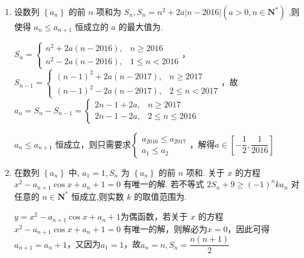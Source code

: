 \begin{enumerate}
\begin{jieda}
        综上，$k \in [-5, -3]$
    \end{jieda}
    
    \item 设数列 $\left\{  {a}_{n}\right\}$ 的前 $n$ 项和为 ${S}_{n},{S}_{n} = {n}^{2} + {2a}\left| {n - {2016}}\right| \left( {a > 0,n \in  {\mathbf{N}}^{ * }}\right)$ ,则使得 ${a}_{n} \leq  {a}_{n + 1}$ 恒成立的 $a$ 的最大值为.
    \begin{jieda}
    
        $S_n = \left\{\begin{array}{ll}
             n^2+2a(n-2016), & n \geq 2016 \\
             n^2-2a(n-2016), & 1 \leq n < 2016 
        \end{array}\right.$，$S_{n-1} = \left\{\begin{array}{ll}
             (n-1)^2+2a(n-2017), & n \geq 2017 \\
             (n-1)^2-2a(n-2017), & 2 \leq n < 2017 
        \end{array}\right.$，故$a_n = S_n - S_{n-1} = \left\{\begin{array}{ll}
            2n-1+2a, & n \geq 2017 \\
            2n-1-2a, & 2 \leq n \leq 2016
        \end{array}\right.$

        ${a}_{n} \leq  {a}_{n + 1}$ 恒成立，则只需要求$\left\{\begin{array}{l}
             a_{2016} \leq a_{2017}  \\
             a_1 \leq a_2 
        \end{array}\right.$，解得$a \in \left[-\dfrac{1}{2}, \dfrac{1}{2016}\right]$
    \end{jieda}
    
    \item 在数列 $\left\{  {a}_{n}\right\}$ 中, ${a}_{1} = 1,{S}_{n}$ 为 $\left\{  {a}_{n}\right\}$ 的前 $n$ 项和. 关于 $x$ 的方程 ${x}^{2} - {a}_{n + 1}\cos x + {a}_{n} + 1 = 0$ 有唯一的解. 若不等式 $2{S}_{n} + 9 \geq  {\left( -1\right) }^{n}k{a}_{n}$ 对任意的 $n \in  {\mathbf{N}}^{ * }$ 恒成立,则实数 $k$ 的取值范围为.
    \begin{jieda}
        $y = {x}^{2} - {a}_{n + 1}\cos x + {a}_{n} + 1$为偶函数，若关于 $x$ 的方程 ${x}^{2} - {a}_{n + 1}\cos x + {a}_{n} + 1 = 0$ 有唯一的解，则解必为$x = 0$，因此可得$a_{n+1} = a_n + 1$，又因为$a_1 = 1$，故$a_n = n, S_n = \dfrac{n(n+1)}{2}$


\end{jieda}
\end{enumerate}
